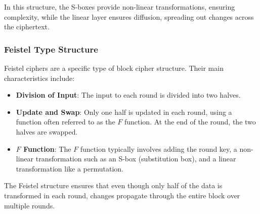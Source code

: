 \documentclass[12pt]{article}
\begin{document}
In this structure, the S-boxes provide non-linear transformations, ensuring complexity, while the linear layer ensures diffusion, spreading out changes across the ciphertext.

\subsubsection*{Feistel Type Structure}

Feistel ciphers are a specific type of block cipher structure. Their main characteristics include:

\begin{itemize}
    \item \textbf{Division of Input}: The input to each round is divided into two halves.

    \item \textbf{Update and Swap}: Only one half is updated in each round, using a function often referred to as the \(F\) function. At the end of the round, the two halves are swapped.

    \item \textbf{\(F\) Function}: The \(F\) function typically involves adding the round key, a non-linear transformation such as an S-box (substitution box), and a linear transformation like a permutation.
\end{itemize}

The Feistel structure ensures that even though only half of the data is transformed in each round, changes propagate through the entire block over multiple rounds.
\end{document}
